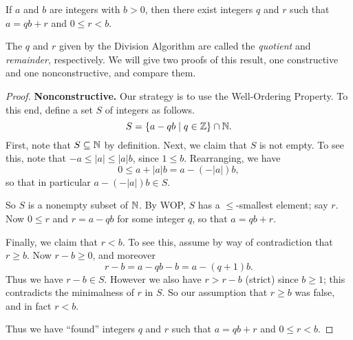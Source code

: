 \begin{thm}
If \(a\) and \(b\) are integers with \(b > 0\), then there exist integers \(q\) and \(r\) such that \(a = qb + r\) and \(0 \leq r < b\).
\end{thm}

The \(q\) and \(r\) given by the Division Algorithm are called the \emph{quotient} and \emph{remainder}, respectively.
We will give two proofs of this result, one constructive and one nonconstructive, and compare them.

\begin{proof}
\textbf{Nonconstructive.} Our strategy is to use the Well-Ordering Property.
To this end, define a set \(S\) of integers as follows.
\[ S = \{ a - qb \mid q \in \mathbb{Z} \} \cap \mathbb{N}. \]
First, note that \(S \subseteq \mathbb{N}\) by definition.
Next, we claim that \(S\) is not empty.
To see this, note that \(-a \leq |a| \leq |a|b\), since \(1 \leq b\).
Rearranging, we have \[ 0 \leq a + |a|b = a - (-|a|)b, \] so that in particular \(a - (-|a|)b \in S\).

So \(S\) is a nonempty subset of \(\mathbb{N}\).
By WOP, \(S\) has a \(\leq\)-smallest element; say \(r\).
Now \(0 \leq r\) and \(r = a - qb\) for some integer \(q\), so that \(a = qb + r\).

Finally, we claim that \(r < b\).
To see this, assume by way of contradiction that \(r \geq b\).
Now \(r-b \geq 0\), and moreover \[ r-b = a - qb - b = a - (q+1)b. \]
Thus we have \(r-b \in S\).
However we also have \(r > r-b\) (strict) since \(b \geq 1\); this contradicts the minimalness of \(r\) in \(S\).
So our assumption that \(r \geq b\) was false, and in fact \(r < b\).

Thus we have ``found'' integers \(q\) and \(r\) such that \(a = qb + r\) and \(0 \leq r < b\).
\end{proof}


